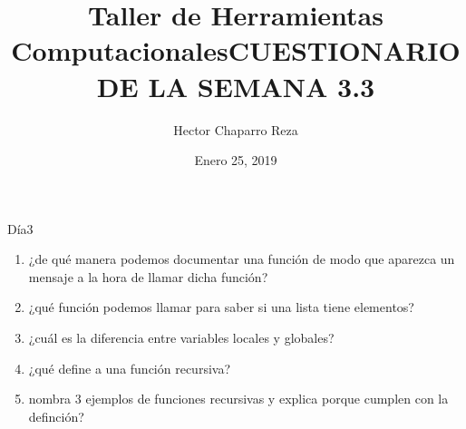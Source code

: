 \documentclass[letterpaper, 12pt, oneside]{article}
\title{\Huge{Taller de Herramientas Computacionales}}
\author{Hector Chaparro Reza}
\date{Enero 25, 2019}
\begin{document}
	\title{\Huge{CUESTIONARIO DE LA SEMANA 3.3}}	
	Día3
	\begin{enumerate}
		\item ¿de qué manera podemos documentar una función de modo que aparezca un mensaje a la hora de llamar dicha función?
		\item ¿qué función podemos llamar para saber si una lista tiene elementos?
		\item ¿cuál es la diferencia entre variables locales y globales?
		\item ¿qué define a una función recursiva?
		\item nombra 3 ejemplos de funciones recursivas y explica porque cumplen con la definción?
	\end{enumerate}
\end{document}
